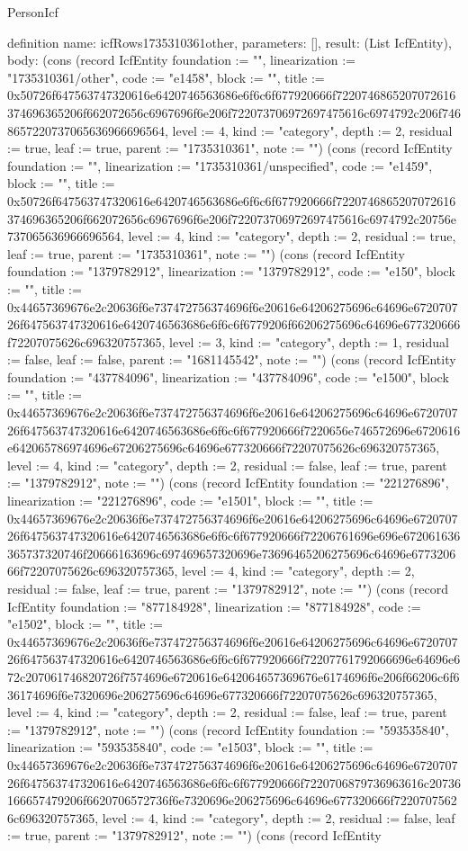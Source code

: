\begin{lexlean}{PersonIcf}
\begin{semanticmodule}
definition{
  name: icfRows1735310361other,
  parameters: [],
  result: (List IcfEntity),
  body: (cons (record IcfEntity {foundation := "", linearization := "1735310361/other", code := "e1458", block := "", title := 0x50726f647563747320616e6420746563686e6f6c6f677920666f7220746865207072616374696365206f662072656c6967696f6e206f722073706972697475616c6974792c206f7468657220737065636966696564, level := 4, kind := "category", depth := 2, residual := true, leaf := true, parent := "1735310361", note := ""}) (cons (record IcfEntity {foundation := "", linearization := "1735310361/unspecified", code := "e1459", block := "", title := 0x50726f647563747320616e6420746563686e6f6c6f677920666f7220746865207072616374696365206f662072656c6967696f6e206f722073706972697475616c6974792c20756e737065636966696564, level := 4, kind := "category", depth := 2, residual := true, leaf := true, parent := "1735310361", note := ""}) (cons (record IcfEntity {foundation := "1379782912", linearization := "1379782912", code := "e150", block := "", title := 0x44657369676e2c20636f6e737472756374696f6e20616e64206275696c64696e672070726f647563747320616e6420746563686e6f6c6f6779206f66206275696c64696e677320666f72207075626c696320757365, level := 3, kind := "category", depth := 1, residual := false, leaf := false, parent := "1681145542", note := ""}) (cons (record IcfEntity {foundation := "437784096", linearization := "437784096", code := "e1500", block := "", title := 0x44657369676e2c20636f6e737472756374696f6e20616e64206275696c64696e672070726f647563747320616e6420746563686e6f6c6f677920666f7220656e746572696e6720616e642065786974696e67206275696c64696e677320666f72207075626c696320757365, level := 4, kind := "category", depth := 2, residual := false, leaf := true, parent := "1379782912", note := ""}) (cons (record IcfEntity {foundation := "221276896", linearization := "221276896", code := "e1501", block := "", title := 0x44657369676e2c20636f6e737472756374696f6e20616e64206275696c64696e672070726f647563747320616e6420746563686e6f6c6f677920666f72206761696e696e672061636365737320746f20666163696c697469657320696e73696465206275696c64696e677320666f72207075626c696320757365, level := 4, kind := "category", depth := 2, residual := false, leaf := true, parent := "1379782912", note := ""}) (cons (record IcfEntity {foundation := "877184928", linearization := "877184928", code := "e1502", block := "", title := 0x44657369676e2c20636f6e737472756374696f6e20616e64206275696c64696e672070726f647563747320616e6420746563686e6f6c6f677920666f72207761792066696e64696e672c207061746820726f7574696e6720616e642064657369676e6174696f6e206f66206c6f636174696f6e7320696e206275696c64696e677320666f72207075626c696320757365, level := 4, kind := "category", depth := 2, residual := false, leaf := true, parent := "1379782912", note := ""}) (cons (record IcfEntity {foundation := "593535840", linearization := "593535840", code := "e1503", block := "", title := 0x44657369676e2c20636f6e737472756374696f6e20616e64206275696c64696e672070726f647563747320616e6420746563686e6f6c6f677920666f7220706879736963616c20736166657479206f6620706572736f6e7320696e206275696c64696e677320666f72207075626c696320757365, level := 4, kind := "category", depth := 2, residual := false, leaf := true, parent := "1379782912", note := ""}) (cons (record IcfEntity }
\end{semanticmodule}
\end{lexlean}
